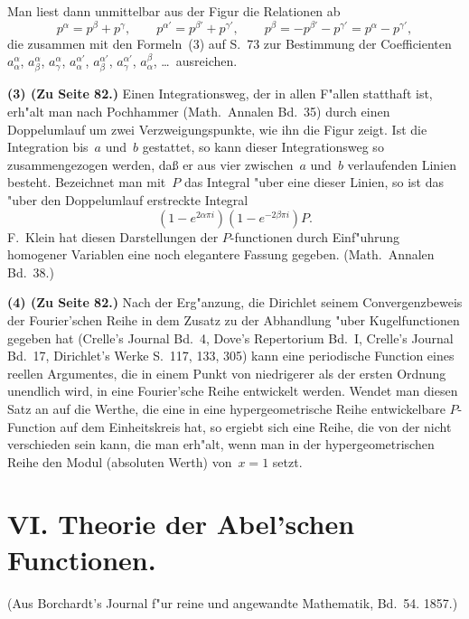\documentclass[12pt,a4paper]{book}
\theoremstyle{definition}
\theoremstyle{remark}
\begin{document}
Man liest dann unmittelbar aus der Figur die Relationen ab
\[
p^\alpha = p^\beta + p^\gamma,\qquad
p^{\alpha'} = p^{\beta'} + p^{\gamma'},\qquad
p^\beta = -p^{\beta'} - p^{\gamma'} = p^\alpha - p^{\gamma'},
\]
die zusammen mit den Formeln~(3) auf S.~73 zur Bestimmung der
Coefficienten $a_\alpha^\alpha$, $a_\beta^\alpha$, $a_\gamma^\alpha$, $a_\alpha^{\alpha'}$,
$a_\beta^{\alpha'}$, $a_\gamma^{\alpha'}$, $a_\alpha^\beta$, \ldots\ ausreichen.

\textbf{(3) (Zu Seite 82.)} Einen Integrationsweg, der in allen F"allen
statthaft ist, erh"alt man nach Pochhammer (Math.\ Annalen Bd.~35)
durch einen Doppelumlauf um zwei Verzweigungspunkte, wie ihn die
Figur zeigt. Ist die Integration bis~$a$ und~$b$ gestattet, so kann
dieser Integrationsweg so zusammengezogen werden, da\ss{} er aus vier
zwischen~$a$ und~$b$ verlaufenden Linien besteht. Bezeichnet man mit~$P$
das Integral "uber eine dieser Linien, so ist das "uber den Doppelumlauf
erstreckte Integral
\[
(1 - e^{2\alpha\pi i})(1 - e^{-2\beta\pi i})P.
\]
F.\ Klein hat diesen Darstellungen der $P$-functionen durch Einf"uhrung
homogener Variablen eine noch elegantere Fassung gegeben.
(Math.\ Annalen Bd.~38.)

\textbf{(4) (Zu Seite 82.)} Nach der Erg"anzung, die Dirichlet seinem
Convergenzbeweis der Fourier'schen Reihe in dem Zusatz zu der
Abhandlung "uber Kugelfunctionen gegeben hat (Crelle's Journal
Bd.~4, Dove's Repertorium Bd.~I, Crelle's Journal Bd.~17, Dirichlet's
Werke S.~117, 133, 305) kann eine periodische Function eines reellen
Argumentes, die in einem Punkt von niedrigerer als der ersten Ordnung
unendlich wird, in eine Fourier'sche Reihe entwickelt werden. Wendet
man diesen Satz an auf die Werthe, die eine in eine hypergeometrische
Reihe entwickelbare $P$-Function auf dem Einheitskreis hat, so ergiebt
sich eine Reihe, die von der nicht verschieden sein kann, die man erh"alt,
wenn man in der hypergeometrischen Reihe den Modul (absoluten Werth)
von~$x = 1$ setzt.

\newpage
\section*{VI. Theorie der Abel'schen Functionen.}
\label{sec:abel}

\begin{center}
(Aus Borchardt's Journal f"ur reine und angewandte Mathematik, Bd.~54. 1857.)
\end{center}
\end{document}
